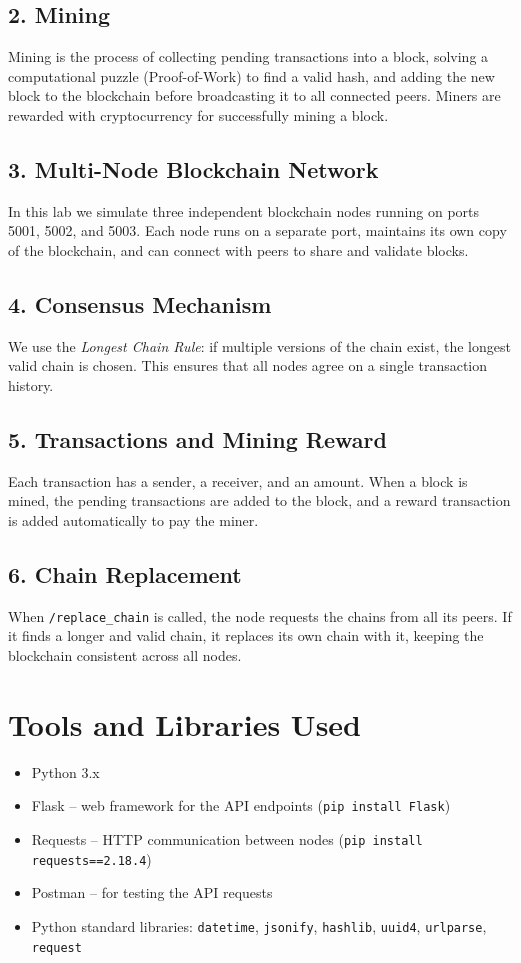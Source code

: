 \documentclass[12pt,a4paper]{article}
\begin{document}
\subsection{2. Mining}
Mining is the process of collecting pending transactions into a block, solving a computational puzzle (Proof-of-Work) to find a valid hash, and adding the new block to the blockchain before broadcasting it to all connected peers. Miners are rewarded with cryptocurrency for successfully mining a block.

\subsection{3. Multi-Node Blockchain Network}
In this lab we simulate three independent blockchain nodes running on ports 5001, 5002, and 5003. Each node runs on a separate port, maintains its own copy of the blockchain, and can connect with peers to share and validate blocks.

\subsection{4. Consensus Mechanism}
We use the \emph{Longest Chain Rule}: if multiple versions of the chain exist, the longest valid chain is chosen. This ensures that all nodes agree on a single transaction history.

\subsection{5. Transactions and Mining Reward}
Each transaction has a sender, a receiver, and an amount. When a block is mined, the pending transactions are added to the block, and a reward transaction is added automatically to pay the miner.

\subsection{6. Chain Replacement}
When \texttt{/replace\_chain} is called, the node requests the chains from all its peers. If it finds a longer and valid chain, it replaces its own chain with it, keeping the blockchain consistent across all nodes.

\section{Tools and Libraries Used}
\begin{itemize}
    \item Python 3.x
    \item Flask -- web framework for the API endpoints (\texttt{pip install Flask})
    \item Requests -- HTTP communication between nodes (\texttt{pip install requests==2.18.4})
    \item Postman -- for testing the API requests
    \item Python standard libraries: \texttt{datetime}, \texttt{jsonify}, \texttt{hashlib}, \texttt{uuid4}, \texttt{urlparse}, \texttt{request}
\end{itemize}
\end{document}
